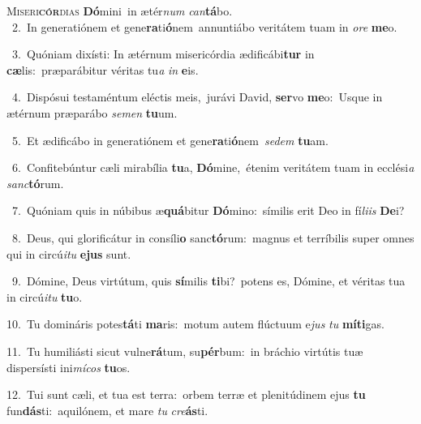 \lettrine{\initial\textcolor{\initialcolor}{M}}{iseri\-\textbf{cór}\-dias} \textbf{Dó}\-mini~\star in ætér\textit{num} \textit{can}\-\textbf{tá}bo.\\
{\numbfont\textcolor{\numbcolor}{~2.}}~In generatiónem et gene\-\textbf{ra}\-ti\-\textbf{ó}\-nem~\star annuntiábo veritátem tuam in \textit{o}\-\textit{re} \textbf{me}\-o.\par
{\numbfont\textcolor{\numbcolor}{~3.}}~Quóniam dixísti: In ætérnum misericórdia ædificábi\textbf{tur} in \textbf{cæ}\-lis:~\star præparábitur véritas tu\textit{a} \textit{in} \textbf{e}\-is.\par
{\numbfont\textcolor{\numbcolor}{~4.}}~Dispósui testaméntum eléctis meis,~\dagger jurávi David, \textbf{ser}\-vo \textbf{me}\-o:~\star Usque in ætérnum præparábo \textit{se}\-\textit{men} \textbf{tu}\-um.\par
{\numbfont\textcolor{\numbcolor}{~5.}}~Et ædificábo in generatiónem et gene\-\textbf{ra}\-ti\-\textbf{ó}\-nem~\star \textit{se}\-\textit{dem} \textbf{tu}\-am.\par
{\numbfont\textcolor{\numbcolor}{~6.}}~Confitebúntur cæli mirabília \textbf{tu}\-a, \textbf{Dó}\-mine,~\star étenim veritátem tuam in ecclési\textit{a} \textit{sanc}\-\textbf{tó}rum.\par
{\numbfont\textcolor{\numbcolor}{~7.}}~Quóniam quis in núbibus æ\-\textbf{quá}\-bitur \textbf{Dó}\-mino:~\star símilis erit Deo in fí\-\textit{li}\-\textit{is} \textbf{De}\-i?\par
{\numbfont\textcolor{\numbcolor}{~8.}}~Deus, qui glorificátur in consíli\textbf{o} sanc\-\textbf{tó}\-rum:~\star magnus et terríbilis super omnes qui in circú\-\textit{i}\-\textit{tu} \textbf{e}\-\textbf{jus} sunt.\par
{\numbfont\textcolor{\numbcolor}{~9.}}~Dómine, Deus virtútum, quis \textbf{sí}\-milis \textbf{ti}\-bi?~\star potens es, Dómine, et véritas tua in circú\-\textit{i}\-\textit{tu} \textbf{tu}\-o.\par
{\numbfont\textcolor{\numbcolor}{10.}}~Tu domináris potes\-\textbf{tá}\-ti \textbf{ma}\-ris:~\star motum autem flúctuum e\textit{jus} \textit{tu} \textbf{mí}\-\textbf{ti}gas.\par
{\numbfont\textcolor{\numbcolor}{11.}}~Tu humiliásti sicut vulne\-\textbf{rá}\-tum, su\-\textbf{pér}\-bum:~\star in bráchio virtútis tuæ dispersísti ini\-\textit{mí}\-\textit{cos} \textbf{tu}\-os.\par
{\numbfont\textcolor{\numbcolor}{12.}}~Tui sunt cæli, et tua est terra:~\dagger orbem terræ et plenitúdinem ejus \textbf{tu} fun\-\textbf{dás}\-ti:~\star aquilónem, et mare \textit{tu} \textit{cre}\-\textbf{ás}ti.\par
